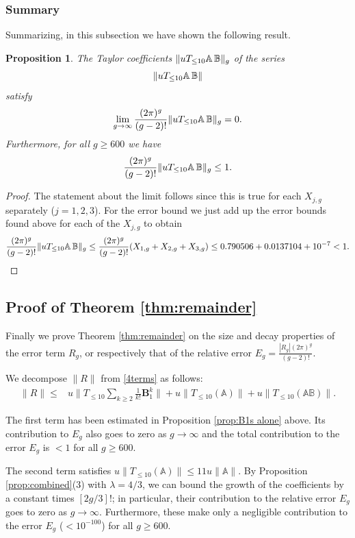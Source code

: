 \documentclass[12pt]{amsart}
\newtheorem{prop}[thm]{Proposition}
\theoremstyle{definition}
\numberwithin{equation}{section}
\newcommand{\bB}{\mathbf{B}}
\theoremstyle{definition} %
\theoremstyle{remark}
\begin{document}
\subsubsection{Summary}
Summarizing, in this subsection we have shown the following result.
\begin{prop}\label{prop:mixed summary}
The Taylor coefficients $\|uT_{\leq 10}\mathbb{A}\,  \mathbb{B} \|_g$ of the series 
\[
\|uT_{\leq 10}\mathbb{A}\,  \mathbb{B} \|
\]
satisfy
\[
\lim_{g\to \infty} \frac{(2\pi)^g}{(g-2)!} \|uT_{\leq 10}\mathbb{A}\,  \mathbb{B} \|_g =0.
\]
Furthermore, for all $g\geq 600$ we have 
\[
    \frac{(2\pi)^g}{(g-2)!} \|uT_{\leq 10}\mathbb{A}\,  \mathbb{B} \|_g 
    \leq 1.
\]
\end{prop}
\begin{proof}
The statement about the limit follows since this is true for each $X_{j,g}$ separately ($j=1,2,3$).
For the error bound we just add up the error bounds found above for each of the $X_{j,g}$ to obtain
\[
    \frac{(2\pi)^g}{(g-2)!} \|uT_{\leq 10}\mathbb{A}\,  \mathbb{B} \|_g 
    \leq \frac{(2\pi)^g}{(g-2)!}( X_{1,g}+X_{2,g}+X_{3,g})\leq 0.790506+0.0137104+10^{-7}<1.
\]
\end{proof}




\subsection{Proof of Theorem \ref{thm:remainder}}
\label{sec:thm rem proof}
\label{sec:asympend}

Finally we prove Theorem \ref{thm:remainder} on the size and decay properties of the error term $R_g$, or respectively that of the relative error $E_g = \frac{|R_g| (2\pi)^g}{(g-2)!}$.

We decompose $\|R\|$ from \eqref{4terms} as follows:
\begin{align*}
    \|R\|
    \leq& 
u \Big\| T_{\leq 10}\sum_{k\geq 2} \frac1{k!}\bB_1^k \Big\|
+ u \| T_{\leq 10}(\mathbb{A})\|
 +u\|T_{\leq 10}(\mathbb{A} \mathbb{B})\|.
\end{align*}

The first term has been estimated in Proposition \ref{prop:B1s alone} above. Its contribution to $E_g$ also goes to zero as $g\to\infty$ and the total contribution to the error $E_g$  is $<1$ for all $g\geq 600$.

The second term satisfies $u\| T_{\leq 10} (\mathbb{A})\| \leq 11 u\|\mathbb{A} \|$. By Proposition \ref{prop:combined}(3) with $\lambda = 4/3$, we can bound the growth of the coefficients by a constant times $[2g/3]!$; in particular,
their contribution to the relative error $E_g$ goes to zero as $g\to \infty$. Furthermore, these make only a negligible contribution to the error $E_g$ ($<10^{-100}$) for all $g\geq 600$.
\end{document}
